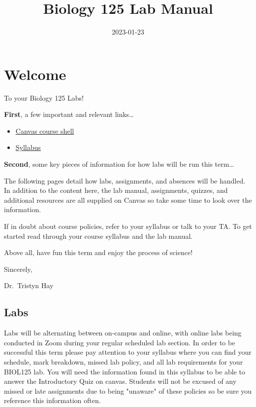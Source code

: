 \documentclass[
]{book}
\title{Biology 125 Lab Manual}
\author{}
\date{\vspace{-2.5em}2023-01-23}
\providecommand{\tightlist}{%
  \setlength{\itemsep}{0pt}\setlength{\parskip}{0pt}}
\begin{document}
\maketitle

{
\setcounter{tocdepth}{1}
\tableofcontents
}
\hypertarget{welcome}{%
\chapter*{Welcome}\label{welcome}}

To your Biology 125 Labs!

\textbf{First}, a few important and relevant links\ldots{}

\begin{itemize}
\tightlist
\item
  \href{https://canvas.ubc.ca/courses/90148}{Canvas course shell}
\item
  \href{https://canvas.ubc.ca/courses/90148/assignments/syllabus}{Syllabus}
\end{itemize}

\textbf{Second}, some key pieces of information for how labs will be run this term\ldots{}

The following pages detail how labs, assignments, and absences will be handled. In addition to the content here, the lab manual, assignments, quizzes, and additional resources are all supplied on Canvas so take some time to look over the information.

If in doubt about course policies, refer to your syllabus or talk to your TA. To get started read through your course syllabus and the lab manual.

Above all, have fun this term and enjoy the process of science!

Sincerely,

Dr.~Tristyn Hay

\hypertarget{labs}{%
\section*{Labs}\label{labs}}

Labs will be alternating between on-campus and online, with online labs being conducted in Zoom during your regular scheduled lab section. In order to be successful this term please pay attention to your syllabus where you can find your schedule, mark breakdown, missed lab policy, and all lab requirements for your BIOL125 lab. You will need the information found in this syllabus to be able to answer the Introductory Quiz on canvas. Students will not be excused of any missed or late assignments due to being "unaware" of these policies so be sure you reference this information often.
\end{document}
